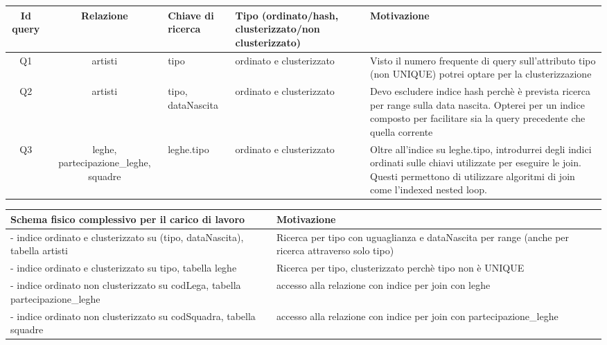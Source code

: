 \documentclass[a4paper]{article}
\begin{document}


\begin{center}
\begin{footnotesize}
\begin{tabular}{|c|c|p{2cm}|p{2cm}|p{5cm}|}
\hline
{\bf Id query} & {\bf Relazione} & \parbox{2cm}{\bf Chiave di ricerca} & \parbox{2cm}{\bf Tipo (ordinato/hash, clusterizzato/non clusterizzato)} & \parbox{5cm}{\bf Motivazione} \\
\hline
Q1 & artisti & tipo & ordinato e clusterizzato &  Visto il numero frequente di query sull'attributo tipo (non UNIQUE) potrei optare per la clusterizzazione\\
Q2 & artisti & tipo, dataNascita & ordinato e clusterizzato & Devo escludere indice hash perchè è prevista ricerca per range sulla data nascita. Opterei per un indice composto per facilitare sia la query precedente che quella corrente\\
Q3 & leghe, partecipazione\_leghe, squadre & leghe.tipo & ordinato e clusterizzato & Oltre all'indice su leghe.tipo, introdurrei degli indici ordinati sulle chiavi utilizzate per eseguire le join. Questi permettono di utilizzare algoritmi di join come l'indexed nested loop.\\
\hline
\end{tabular}
\end{footnotesize}
\end{center}



\begin{center}
\begin{footnotesize}
\begin{tabular}{|p{6.5cm}|p{6.5cm}|}
\hline
\parbox{5cm}{\bf Schema fisico complessivo per il carico di lavoro} &  \parbox{5cm}{\bf Motivazione} \\
\hline
- indice ordinato e clusterizzato su (tipo, dataNascita), tabella artisti& Ricerca per tipo con uguaglianza e dataNascita per range (anche per ricerca attraverso solo tipo) \\
- indice ordinato e clusterizzato su tipo, tabella leghe& Ricerca per tipo, clusterizzato perchè tipo non è UNIQUE\\
- indice ordinato non clusterizzato su codLega, tabella partecipazione\_leghe & accesso alla relazione con indice per join con leghe\\
- indice ordinato non clusterizzato su codSquadra, tabella squadre & accesso alla relazione con indice per join con partecipazione\_leghe\\
\hline
\end{tabular}
\end{footnotesize}
\end{center}
\end{document}
